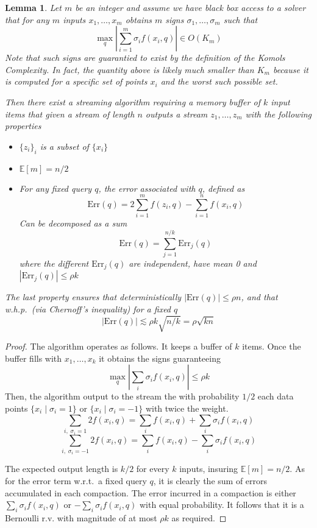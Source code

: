 \documentclass{article} %
\newtheorem{lemma}[theorem]{Lemma}
\newcommand{\el}[1]{\textcolor{blue}{EL: #1}}
\newcommand{\E}{\mathbb{E}}
\begin{document}
\begin{lemma} \label{lem:compactor}
Let $m$ be an integer and assume we have black box access to a solver that for any $m$ inputs $x_1,\ldots,x_m$ obtains $m$ signs $\sigma_1,\ldots,\sigma_m$ such that
$$\max_q \left| \sum_{i=1}^{m} \sigma_i f(x_i, q)\right| \in O(K_m)$$
Note that such signs are guarantied to exist by the definition of the Komols Complexity. 
In fact, the quantity above is likely much smaller than $K_m$ because it is computed for a specific set of points $x_i$ and the worst such possible set.


Then there exist a streaming algorithm requiring a memory buffer of $k$ input items that given a stream of length $n$ outputs a stream $z_1,\ldots,z_m$ with the following properties
\begin{itemize}
\item $\{z_i\}_i$ is a subset of $\{x_i\}$
\item $\E[m] = n/2$
\item For any fixed query $q$, the error associated with $q$, defined as
$$\text{Err}(q) = 2\sum_{i=1}^m f(z_i,q) - \sum_{i=1}^n f(x_i,q)  $$
Can be decomposed as a sum
$$\text{Err}(q) = \sum_{j=1}^{n/k} \text{Err}_j(q)$$
where the different $\text{Err}_j(q)$ are independent, have mean 0 and $|\text{Err}_j(q)| \leq \rho k$
\end{itemize}
The last property ensures that deterministically $|\text{Err}(q)| \leq \rho n$, and that w.h.p.\ (via Chernoff's inequality) for a fixed $q$ 
$$|\text{Err}(q)| \lesssim \rho k\sqrt{n/k} = \rho \sqrt{kn}$$
\end{lemma}
\begin{proof}
The algorithm operates as follows. It keeps a buffer of $k$ items. Once the buffer fills with $x_1,\ldots,x_k$ it obtains the signs guaranteeing
$$\max_q \left| \sum_i \sigma_i f(x_i, q)\right| \leq \rho k$$
Then, the algorithm output to the stream the with probability $1/2$ each data points $\{x_i \; | \; \sigma_i = 1\}$ or $\{x_i \; | \; \sigma_i = -1\}$ with twice the weight.
$$\sum_{i ,\; \sigma_i=1} 2f(x_i, q) = \sum_{i} f(x_i, q) +  \sum_{i} \sigma_i f(x_i, q)$$
$$\sum_{i ,\; \sigma_i=-1} 2f(x_i, q) = \sum_{i} f(x_i, q) - \sum_{i} \sigma_i f(x_i, q)$$

The expected output length is $k/2$ for every $k$ inputs, insuring $\E[m]=n/2$. 
As for the error term w.r.t.\ a fixed query $q$, it is clearly the sum of errors accumulated in each compaction. The error incurred in a compaction is either 
$\sum_i \sigma_i f(x_i, q)$ or $-\sum_i \sigma_i f(x_i, q)$ with equal probability. It follows that it is a Bernoulli r.v. with magnitude of at most $\rho k$ as required.
\end{proof}
\end{document}
